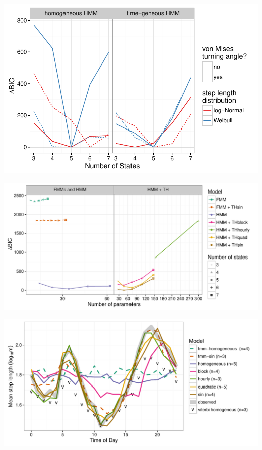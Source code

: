 \documentclass{article}\usepackage[]{graphicx}\usepackage{xcolor}
\makeatletter
\def\maxwidth{ %
  \ifdim\Gin@nat@width>\linewidth
    \linewidth
  \else
    \Gin@nat@width
  \fi
}
\newenvironment{knitrout}{}{} %
\makeatother
\begin{document}
\begin{knitrout}
\color{fgcolor}
\includegraphics[width=\maxwidth]{figure/BICred_plot14-1} 

\end{knitrout}


\clearpage

\begin{knitrout}
\color{fgcolor}
\includegraphics[width=\maxwidth]{figure/adj_BIC_comparisons14-1} 

\end{knitrout}

\clearpage

\begin{knitrout}
\color{fgcolor}
\includegraphics[width=\maxwidth]{figure/avg_step_length_by_time14-1} 

\end{knitrout}
\end{document}
